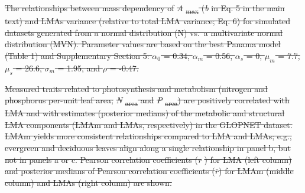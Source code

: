 \documentclass[
  12pt,
  letterpaper,
  DIV=11,
  numbers=noendperiod]{scrartcl}
\numberwithin{equation}{section} %
\providecommand{\DIFdel}[1]{{\protect\color{red}\sout{#1}}}                      %
\begin{document}


{%
\DIFdel{The relationships between mass
dependency of }\emph{\DIFdel{A}}%
\DIFdel{\textsubscript{max} (}\emph{\DIFdel{b}} %
\DIFdel{in Eq. 5 in the main
text) and LMAs variance (relative to total LMA variance; Eq. 6) for
simulated datasets generated from a normal distribution (N) vs.~a
multivariate normal distribution (MVN). Parameter values are based on
the best Panama model (Table 1) and Supplementary Section 5:
\(\alpha_0\) = 0.34, \(\alpha_m\) = 0.56, \(\alpha_s\) = 0, \(\mu_m\) =
7.7, \(\mu_s\) = 26.6, \(\sigma_m\) = 1.95, and \(\rho\) = -0.47.}}







{%
\DIFdel{Measured traits related to
photosynthesis and metabolism (nitrogen and phosphorus per-unit leaf
area; }\emph{\DIFdel{N}}%
\DIFdel{\textsubscript{area} and }\emph{\DIFdel{P}}%
\DIFdel{\textsubscript{area}) are
positively correlated with LMA and with estimates (posterior medians) of
the metabolic and structural LMA components (LMAm and LMAs,
respectively) in the GLOPNET dataset. LMAm yields more consistent
relationships compared to LMA and LMAs; e.g., evergreen and deciduous
leaves align along a single relationship in panel b, but not in panels a
or c. Pearson correlation coefficients (}\emph{\DIFdel{r}}%
\DIFdel{) for LMA (left column)
and posterior medians of Pearson correlation coefficients (\(\bar{r}\))
for LMAm (middle column) and LMAs (right column) are shown.}}

\end{document}

